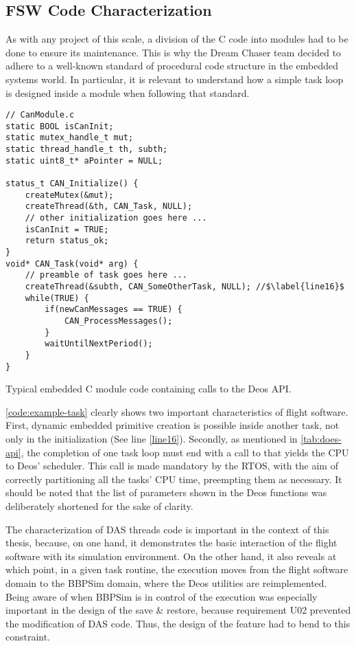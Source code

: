 {\subsection*{FSW Code Characterization}
As with any project of this scale, a division of the C code into modules had to be done to ensure its maintenance. This is why the Dream Chaser team decided to adhere to a well-known standard of procedural code structure in the embedded systems world. In particular, it is relevant to understand how a simple task loop is designed inside a module when following that standard. 
\begin{listing}[H]
	\begin{verbatim}
// CanModule.c
static BOOL isCanInit;
static mutex_handle_t mut;
static thread_handle_t th, subth;
static uint8_t* aPointer = NULL;

status_t CAN_Initialize() {
	createMutex(&mut);
	createThread(&th, CAN_Task, NULL);
	// other initialization goes here ...
	isCanInit = TRUE;
	return status_ok;
}
void* CAN_Task(void* arg) {
	// preamble of task goes here ...
	createThread(&subth, CAN_SomeOtherTask, NULL); //$\label{line16}$
	while(TRUE) {
		if(newCanMessages == TRUE) {
			CAN_ProcessMessages();
		}
		waitUntilNextPeriod();
	}
}
	\end{verbatim}
	\caption{Typical embedded C module code containing calls to the Deos API.}
	\label{code:example-task}
\end{listing}

\autoref{code:example-task} clearly shows two important characteristics of flight software. First, dynamic embedded primitive creation is possible inside another task, not only in the initialization (See line \ref{line16}). Secondly, as mentioned in \autoref{tab:does-api}, the completion of one task loop must end with a call to  that yields the CPU to Deos' scheduler. This call is made mandatory by the RTOS, with the aim of correctly partitioning all the tasks' CPU time, preempting them as necessary. It should be noted that the list of parameters shown in the Deos functions was deliberately shortened for the sake of clarity. 

The characterization of DAS threads code is important in the context of this thesis, because, on one hand, it demonstrates the basic interaction of the flight software with its simulation environment. On the other hand, it also reveals at which point, in a given task routine, the execution moves from the flight software domain to the BBPSim domain, where the Deos utilities are reimplemented. Being aware of when BBPSim is in control of the execution was especially important in the design of the save \& restore, because requirement U02 prevented the modification of DAS code. Thus, the design of the feature had to bend to this constraint.
}